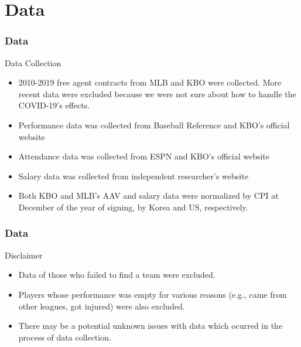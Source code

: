 \documentclass[9pt]{beamer}
\begin{document}
\section{Data}

\begin{frame}
    \frametitle{Data}
    \begin{block}
        {Data Collection}
        \begin{itemize}
            \item 2010-2019 free agent contracts from MLB and KBO were collected. More recent data were excluded because we were not sure about how to handle the COVID-19's effects.
            \item Performance data was collected from Baseball Reference and KBO's official website
            \item Attendance data was collected from ESPN and KBO's official website
            \item Salary data was collected from independent researcher's website
            \item Both KBO and MLB's AAV and salary data were normalized by CPI at December of the year of signing, by Korea and US, respectively.
        \end{itemize}
    \end{block}
\end{frame}

\begin{frame}
    \frametitle{Data}
    \begin{block}{Disclaimer}
        \begin{itemize}
            \item Data of those who failed to find a team were excluded.
            \item Players whose performance was empty for various reasons (e.g., came from other leagues, got injured) were also excluded.
            \item There may be a potential unknown issues with data which ocurred in the process of data collection.
        \end{itemize}
    \end{block}
\end{frame}
\end{document}
